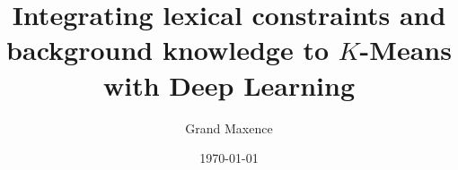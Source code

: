 \title{Integrating lexical constraints and background knowledge to $K$-Means with Deep Learning}
\author{Grand Maxence\\}                                                   
\date{\today}
